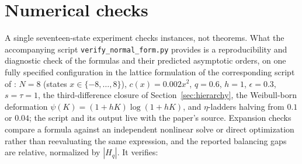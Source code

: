 \documentclass[11pt]{article}
\begin{document}
\section{Numerical checks}\label{sec:certificate}

A single seventeen-state experiment checks instances, not theorems. What the accompanying script \texttt{verify\_normal\_form.py} provides is a reproducibility and diagnostic check of the formulas and their predicted asymptotic orders, on one fully specified configuration in the lattice formulation of the corresponding script of \citet{cotton2026skew}: $N = 8$ (states $x \in \{-8,\dots,8\}$), $c(x) = 0.002x^2$, $q = 0.6$, $h = 1$, $\epsilon = 0.3$, $s = \tau = 1$, the third-difference closure of Section~\ref{sec:hierarchy}, the Weibull-born deformation $\psi(K) = (1+hK)\log(1+hK)$, and $\eta$-ladders halving from $0.1$ or $0.04$; the script and its output live with the paper's source. Expansion checks compare a formula against an independent nonlinear solve or direct optimization rather than reevaluating the same expression, and the reported balancing gaps are relative, normalized by $|H_q|$. It verifies:
\end{document}
